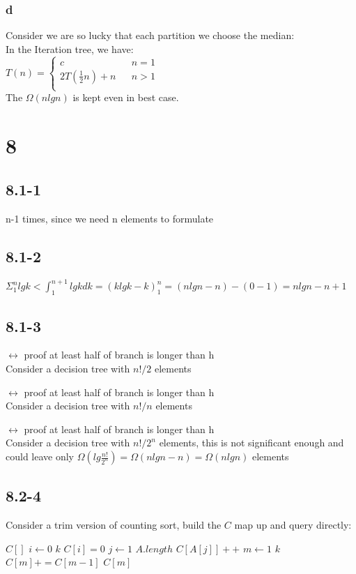 \documentclass[]{article}
\begin{document}
\subsubsection{d}
Consider we are so lucky that each partition we choose the median:\\
In the Iteration tree, we have:\\
$ T(n)=\left\{
\begin{array}{lcl}
c       &      & {n = 1}\\
2T(\frac{1}{2}n) + n     &      & {n > 1}\\
\end{array} \right. $\\
The $\Omega(nlgn)$ is kept even in best case.

\section{8}
\subsection{8.1-1}
n-1 times, since we need n elements to formulate
\subsection{8.1-2}
$\Sigma_{1}^{n}lgk < \int_{1}^{n+1}lgkdk = (klgk - k)_{1}^{n} = (nlgn - n) - (0 - 1) = nlgn -n + 1 $
\subsection{8.1-3}

$ \leftrightarrow $ proof at least half of branch is longer than h
\\Consider a decision tree with $n!/2$ elements

$\leftrightarrow$ proof at least half of branch is longer than h
\\Consider a decision tree with $n!/n$ elements

$\leftrightarrow$ proof at least half of branch is longer than h
\\Consider a decision tree with $n!/2^n$ elements, this is not significant enough and could leave only $\Omega (lg\frac{n!}{2^n}) = \Omega(nlgn - n) = \Omega (nlgn)$ elements

\subsection{8.2-4}
Consider a trim version of counting sort, build the $C$ map up and query directly:
\begin{codebox}
	\li $C []$
	\li \For $i \gets 0$ \To $k$
	\li		\Do $C[i] = 0$
	\End
	\li \For $j \gets 1$ \To $A.length$
	\li		\Do $C[A[j]]++$
	\End
	\li \For $m \gets 1$ \To $k$
	\li		\Do $C[m] += C[m-1]$
	\End
	\li \Return $C[m]$
\end{codebox}
\end{document}
